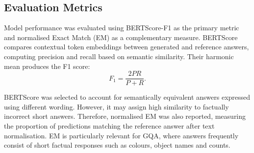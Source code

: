 \subsection{Evaluation Metrics}

Model performance was evaluated using BERTScore-F1 \parencite{zhang2020bertscore} as the primary metric and normalised
Exact Match (EM) as a complementary measure. BERTScore compares contextual token embeddings
between generated and reference answers, computing precision and recall based on semantic 
similarity. Their harmonic mean produces the F1 score:
\[
F_1 = \frac{2PR}{P+R}.
\]

BERTScore was selected to account for semantically equivalent answers expressed using different
wording. However, it may assign high similarity to factually incorrect short answers. Therefore, 
normalised EM was also reported, measuring the proportion of predictions matching the reference
answer after text normalisation. EM is particularly relevant for GQA, where answers frequently consist
of short factual responses such as colours, object names and counts.